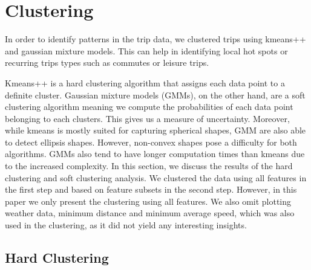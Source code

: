 \section{Clustering}
\label{sec:clustering}

In order to identify patterns in the trip data, we clustered trips using kmeans++ and gaussian mixture models. This can help in identifying local hot spots or recurring trips types such as commutes or leisure trips.

Kmeans++ is a hard clustering algorithm that assigns each data point to a definite cluster. Gaussian mixture models (GMMs), on the other  hand, are a soft clustering algorithm meaning we compute the probabilities of each data point belonging to each clusters. This gives us a measure of uncertainty. Moreover, while kmeans is mostly suited for capturing spherical shapes, GMM are also able to detect ellipsis shapes. However, non-convex shapes pose a difficulty for both algorithms. GMMs also tend to have longer computation times than kmeans due to the increased complexity.
In this section, we discuss the results of the hard clustering and soft clustering analysis. We clustered the data using all features in the first step and based on feature subsets in the second step. However, in this paper we only present the clustering using all features. We also omit plotting weather data, minimum distance and minimum average speed, which was also used in the clustering, as it did not yield any interesting insights.

\subsection{Hard Clustering}
\label{sec:hard_clustering}


